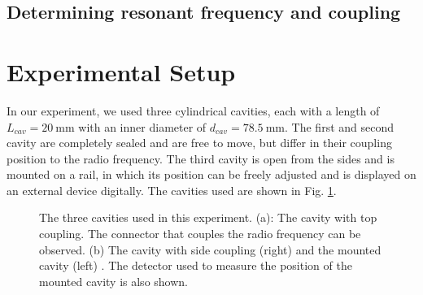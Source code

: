 \documentclass[a4paper]{article}
\numberwithin{equation}{section}
\begin{document}
\subsection{Determining resonant frequency and coupling}

\section{Experimental Setup}

In our experiment, we used three cylindrical cavities, each with a length of
$L_{cav} = \SI{20}{\milli\metre}$ with an inner diameter of $d_{cav} =
\SI{78.5}{\milli\metre}$. The first and second cavity are completely sealed and
are free to move, but differ in their coupling position to the radio frequency.
The third cavity is open from the sides and is mounted on a rail, in which its
position can be freely adjusted and is displayed on an external device
digitally. The cavities used are shown in Fig. \ref*{fig:cavities_equipment}.

\begin{figure}[hbt!]
	\centering
	\quad

	\caption{The three cavities used in this experiment. (a): The cavity with
	top coupling. The connector that couples the radio frequency can be
	observed. (b) The cavity with side coupling (right) and the mounted cavity
	(left) \cite*{Switka22}. The detector used to measure the position of the
	mounted cavity is also shown.}
	\label{fig:cavities_equipment}
\end{figure}
\end{document}
